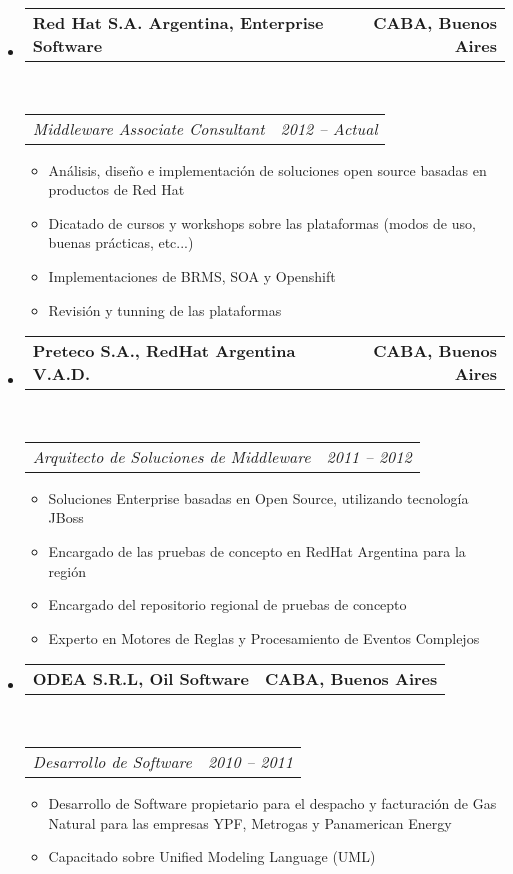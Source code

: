 \documentclass[11pt,4apaper]{article}
\makeatletter
\newcommand{\headerrow}[2]
{\begin{tabular*}{\linewidth}{l@{\extracolsep{\fill}}r}
#1 &
#2 \\
    \end{tabular*}}
\makeatother
\begin{document}
\begin{itemize}
\parskip=0.1em



\item
\headerrow
{\textbf{Red Hat S.A. Argentina, Enterprise Software}}
{\textbf{CABA, Buenos Aires}}
\\
\headerrow
{\emph{Middleware Associate Consultant}}
{\emph{2012 -- Actual}}
\begin{itemize}
  \item Análisis, diseño e implementación de soluciones open source basadas en productos de Red Hat
  \item Dicatado de cursos y workshops sobre las plataformas (modos de uso, buenas prácticas, etc...)
  \item Implementaciones de BRMS, SOA y Openshift
  \item Revisión y tunning de las plataformas
\end{itemize}



\item
\headerrow
{\textbf{Preteco S.A., RedHat Argentina V.A.D.}}
{\textbf{CABA, Buenos Aires}}
\\
\headerrow
{\emph{Arquitecto de Soluciones de Middleware}}
{\emph{2011 -- 2012}}

\begin{itemize}
  \item Soluciones Enterprise basadas en Open Source, utilizando tecnología JBoss
  \item Encargado de las pruebas de concepto en RedHat Argentina para la región
  \item Encargado del repositorio regional de pruebas de concepto
  \item Experto en Motores de Reglas y Procesamiento de Eventos Complejos
\end{itemize}





\item
\headerrow
{\textbf{ODEA S.R.L, Oil Software}}
{\textbf{CABA, Buenos Aires}}
\\
        \headerrow
{\emph{Desarrollo de Software}}
{\emph{2010 -- 2011}}
\begin{itemize}
  \item Desarrollo de Software propietario para el despacho y facturación de
    Gas Natural para las empresas YPF, Metrogas y Panamerican Energy
  \item Capacitado sobre Unified Modeling Language (UML)
\end{itemize}

    
\end{itemize}
\end{document}
